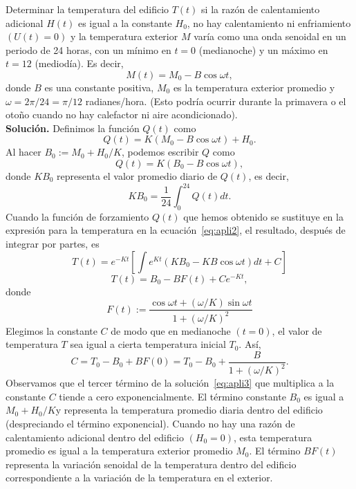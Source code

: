\begin{ejemplo}
	Determinar la temperatura del edificio $T(t)$ si la razón de calentamiento adicional $H(t)$ es igual a la constante $H_0$, no hay calentamiento ni enfriamiento $(U(t) = 0)$ y la temperatura exterior $M$ varía como una onda senoidal en un periodo de 24 horas, con un mínimo en $t = 0$ (medianoche) y un máximo en $t = 12$ (mediodía). Es decir, 
	\begin{equation}
		M(t) = M_0 - B \cos \omega t,
	\end{equation}
	donde $B$ es una constante positiva, $M_0$ es la temperatura exterior promedio y $\omega = 2\pi /24 =\pi /12$ radianes/hora. (Esto podría ocurrir durante la primavera o el otoño cuando no hay calefactor ni aire acondicionado).\\
	\textbf{Solución.} Definimos la función $Q(t)$ como
	\begin{equation}
		Q(t) = K(M_0 - B \cos \omega t) + H_0.
	\end{equation}
	Al hacer $B_0 := M_0 + H_0/K$, podemos escribir $Q$ como
	\begin{equation}
		Q(t) = K(B_0 - B \cos \omega t),
	\end{equation}
	donde $KB_0$ representa el valor promedio diario de $Q(t)$, es decir,
	\begin{equation}
		KB_0 = \dfrac{1}{24}\int_{0}^{24}Q(t)dt.
	\end{equation}
	Cuando la función de forzamiento $Q(t)$ que hemos obtenido se sustituye en la expresión para la temperatura en la ecuación~\eqref{eq:apli2}, el resultado, después de integrar por partes, es
	\begin{equation}
		T(t) = e^{-Kt}[\int e^{Kt}(KB_0 - KB \cos \omega t)dt + C]
	\end{equation}
	\begin{equation}\label{eq:apli3}
		T(t) = B_0 - BF(t) + Ce^{-Kt},
	\end{equation}
	donde
	\begin{equation}
		F(t) := \dfrac{\cos \omega t + (\omega / K) \sin \omega t}{1 + (\omega /K)^2}
	\end{equation}
	Elegimos la constante $C$ de modo que en medianoche $(t=0)$, el valor de temperatura $T$ sea igual a cierta temperatura inicial $T_0$. Así,
	\begin{equation}
		C = T_0 - B_0 + BF(0) = T_0 - B_0 + \dfrac{B}{1 + (\omega /K)^2}.
	\end{equation}
	Observamos que el tercer término de la solución~\eqref{eq:apli3} que multiplica a la constante $C$ tiende a cero exponencialmente. El término constante $B_0$ es igual a $M_0 + H_0/K$y representa la temperatura promedio diaria dentro del edificio (despreciando el término exponencial). Cuando no hay una razón de calentamiento adicional dentro del edificio $(H_0 = 0)$, esta temperatura promedio es igual a la temperatura exterior promedio $M_0$. El término $BF(t)$ representa la variación senoidal de la temperatura dentro del edificio correspondiente a la variación de la temperatura en el exterior.
	

\end{ejemplo}
